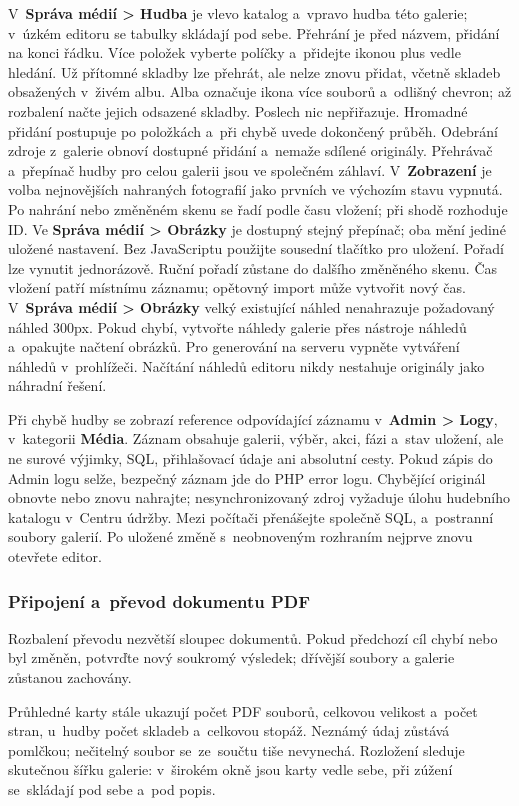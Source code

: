 \documentclass[11pt,a4paper]{article}
\newcommand{\filepath}[1]{\path{#1}}
\newcommand{\ui}[1]{\textbf{#1}}
\begin{document}
V~\ui{Správa médií > Hudba} je vlevo katalog a~vpravo hudba této galerie;
v~úzkém editoru se tabulky skládají pod sebe. Přehrání je před názvem,
přidání na konci řádku. Více položek vyberte políčky a~přidejte ikonou plus
vedle hledání. Už přítomné skladby lze přehrát, ale nelze znovu přidat,
včetně skladeb obsažených v~živém albu. Alba označuje ikona více souborů
a~odlišný chevron; až rozbalení načte jejich odsazené skladby.
Poslech nic nepřiřazuje. Hromadné přidání postupuje po položkách a~při chybě
uvede dokončený průběh. Odebrání zdroje z~galerie obnoví dostupné přidání
a~nemaže sdílené originály. Přehrávač a~přepínač hudby pro celou galerii
jsou ve společném záhlaví. V~\ui{Zobrazení} je volba nejnovějších nahraných
fotografií jako prvních ve výchozím stavu vypnutá. Po nahrání nebo změněném
skenu se řadí podle času vložení; při shodě rozhoduje ID. Ve \ui{Správa médií
> Obrázky} je dostupný stejný přepínač; oba mění jediné uložené nastavení.
Bez JavaScriptu použijte sousední tlačítko pro uložení. Pořadí lze vynutit jednorázově. Ruční pořadí zůstane do dalšího
změněného skenu. Čas vložení patří místnímu záznamu; opětovný import může
vytvořit nový čas. V~\ui{Správa médií > Obrázky}
velký existující náhled nenahrazuje požadovaný náhled 300px. Pokud chybí,
vytvořte náhledy galerie přes nástroje náhledů a~opakujte načtení obrázků.
Pro generování na serveru vypněte vytváření náhledů v~prohlížeči.
Načítání náhledů editoru nikdy nestahuje originály jako náhradní řešení.

Při chybě hudby se zobrazí reference odpovídající záznamu v~\ui{Admin > Logy},
v~kategorii \ui{Média}. Záznam obsahuje galerii, výběr, akci, fázi a~stav
uložení, ale ne surové výjimky, SQL, přihlašovací údaje ani absolutní cesty.
Pokud zápis do Admin logu selže, bezpečný záznam jde do PHP error logu.
Chybějící originál obnovte nebo znovu nahrajte; nesynchronizovaný zdroj
vyžaduje úlohu hudebního katalogu v~Centru údržby. Mezi počítači přenášejte
společně SQL, \filepath{data/music/} a~postranní soubory galerií.
Po uložené změně s~neobnoveným rozhraním nejprve znovu otevřete editor.

\subsubsection{Připojení a~převod dokumentu PDF}
Rozbalení převodu nezvětší sloupec dokumentů. Pokud předchozí cíl chybí nebo byl
změněn, potvrďte nový soukromý výsledek; dřívější soubory a galerie zůstanou
zachovány.

Průhledné karty stále ukazují počet PDF souborů, celkovou velikost
a~počet stran, u~hudby počet skladeb a~celkovou stopáž. Neznámý údaj
zůstává pomlčkou; nečitelný soubor se~ze~součtu tiše nevynechá.
Rozložení sleduje skutečnou šířku galerie: v~širokém okně jsou karty
vedle sebe, při zúžení se~skládají pod sebe a~pod popis.
\end{document}
